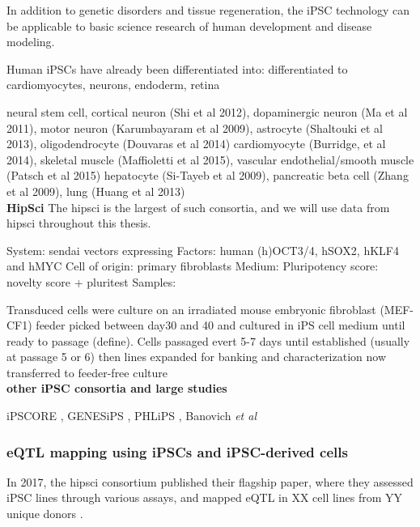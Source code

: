 In addition to genetic disorders and tissue regeneration, the iPSC technology can be applicable to basic science research of human development and disease modeling.

Human iPSCs have already been differentiated into: 
differentiated to cardiomyocytes, neurons, endoderm, retina

neural stem cell, cortical neuron (Shi et al 2012), dopaminergic neuron (Ma et al 2011), motor neuron (Karumbayaram et al 2009), astrocyte (Shaltouki et al 2013), oligodendrocyte (Douvaras et al 2014)
cardiomyocyte (Burridge, et al 2014), skeletal muscle (Maffioletti et al 2015), vascular endothelial/smooth muscle (Patsch et al 2015)
hepatocyte (Si-Tayeb et al 2009), pancreatic beta cell (Zhang et al 2009), lung (Huang et al 2013)\\



\textbf{HipSci}
The \gls{hipsci} is the largest of such consortia, and we will use data from \gls{hipsci} \cite{kilpinen2017common} throughout this thesis.

System: sendai vectors expressing  
Factors: human (h)OCT3/4, hSOX2, hKLF4 and hMYC
Cell of origin: primary fibroblasts
Medium:
Pluripotency score: novelty score + pluritest \cite{muller2011bioinformatic}
Samples:

Transduced cells were culture on an irradiated mouse embryonic fibroblast (MEF-CF1) feeder
picked between day30 and 40 and cultured in iPS cell medium until ready to passage (define). 
Cells passaged evert 5-7 days until established (usually at passage 5 or 6)
then lines expanded for banking and characterization
now transferred to feeder-free culture\\

\textbf{other iPSC consortia and large studies}

iPSCORE \cite{panopoulos2017ipscore}, GENESiPS \cite{carcamo2017analysis}, PHLiPS \cite{pashos2017large}, Banovich \textit{et al} \cite{banovich2018impact}

\subsubsection{eQTL mapping using iPSCs and iPSC-derived cells}

In 2017, the \gls{hipsci} consortium published their flagship paper, where they assessed iPSC lines through various assays, and mapped eQTL in XX cell lines from YY unique donors
\cite{kilpinen2017common}.

